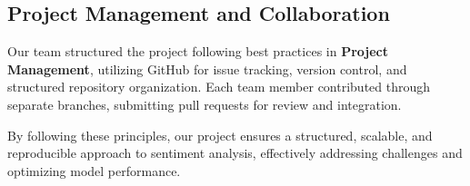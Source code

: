\subsection{Project Management and Collaboration}

Our team structured the project following best practices in \textbf{Project Management}, utilizing GitHub for issue tracking, version control, and structured repository organization. Each team member contributed through separate branches, submitting pull requests for review and integration. 

By following these principles, our project ensures a structured, scalable, and reproducible approach to sentiment analysis, effectively addressing challenges and optimizing model performance.


\newpage